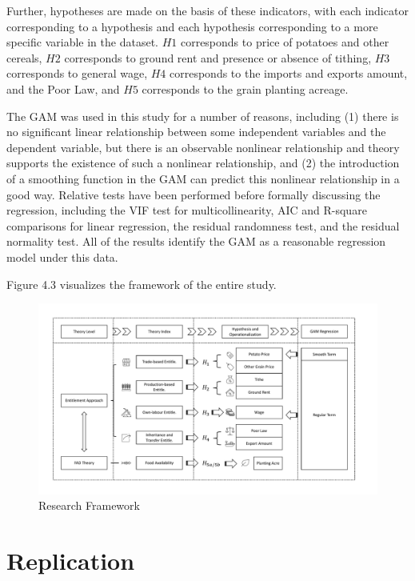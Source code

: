 Further, hypotheses are made on the basis of these indicators, with each indicator corresponding to a hypothesis and each hypothesis corresponding to a more specific variable in the dataset. $H1$ corresponds to price of potatoes and other cereals, $H2$ corresponds to ground rent and presence or absence of tithing, $H3$ corresponds to general wage, $H4$ corresponds to the imports and exports amount, and the Poor Law, and $H5$ corresponds to the grain planting acreage.

The GAM was used in this study for a number of reasons, including (1) there is no significant linear relationship between some independent variables and the dependent variable, but there is an observable nonlinear relationship and theory supports the existence of such a nonlinear relationship, and (2) the introduction of a smoothing function in the GAM can predict this nonlinear relationship in a good way. Relative tests have been performed before formally discussing the regression, including the VIF test for multicollinearity, AIC and R-square comparisons for linear regression, the residual randomness test, and the residual normality test. All of the results identify the GAM as a reasonable regression model under this data.

Figure 4.3 visualizes the framework of the entire study.

\begin{landscape}
    \begin{figure}[h]
        \centering
        \caption{Research Framework}
        \includegraphics[width=1.5\textheight]{../03_outputs/Framework.pdf}
    \end{figure}
\end{landscape}

\section{Replication}
